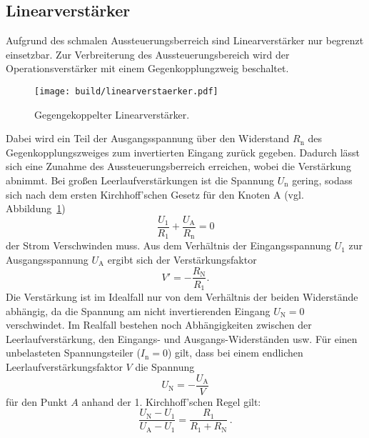 \subsection{Linearverstärker}%
\label{sub:linearverstaerker1}
Aufgrund des schmalen Aussteuerungsberreich sind Linearverstärker nur
begrenzt einsetzbar.
Zur Verbreiterung des Aussteuerungsbereich wird der Operationsverstärker mit einem
Gegenkopplungzweig beschaltet.
\begin{figure}[ht]
		\centering
		\texttt{[image: build/linearverstaerker.pdf]}
		\caption{Gegengekoppelter Linearverstärker.\cite{anleitung}}
		\label{fig:lin}
\end{figure}
Dabei wird ein Teil der Ausgangsspannung über den Widerstand $R_\text{n}$ des
Gegenkopplungszweiges zum invertierten Eingang zurück gegeben.
Dadurch lässt sich eine Zunahme des Aussteuerungsberreich erreichen, wobei die
Verstärkung abnimmt.
Bei großen Leerlaufverstärkungen ist die Spannung $U_\text{n}$ gering, sodass
sich nach dem ersten Kirchhoff'schen Gesetz für den Knoten A (vgl. Abbildung~\ref{fig:lin})
\begin{equation}
		\frac{U_1}{R_1} + \frac{U_\text{A}}{R_\text{n}} = 0
\end{equation}
der Strom Verschwinden muss.
Aus dem Verhältnis der Eingangsspannung $U_1$ zur Ausgangsspannung $U_\text{A}$ ergibt
sich der Verstärkungsfaktor
\begin{equation}
		V' = - \frac{R_\text{N}}{R_1}.
\end{equation}
Die Verstärkung ist im Idealfall nur von dem Verhältnis der beiden
Widerstände abhängig, da die Spannung am nicht invertierenden Eingang $U_\text{N}
= 0$ verschwindet.
Im Realfall bestehen noch Abhängigkeiten zwischen der Leerlaufverstärkung,
den Eingangs- und Ausgangs-Widerständen usw.
Für einen unbelasteten Spannungsteiler ($I_\text{n} = 0$) gilt,
dass bei einem endlichen Leerlaufverstärkungsfaktor $V$ die Spannung
\begin{equation}
		U_\text{N} = - \frac{U_\text{A}}{V}
\end{equation}
für den Punkt $A$ anhand der 1. Kirchhoff'schen Regel gilt:
\begin{equation}
		\frac{U_\text{N}-U_1}{U_\text{A}-U_1} = \frac{R_1}{R_1 + R_\text{N}} \,  .
\end{equation}
